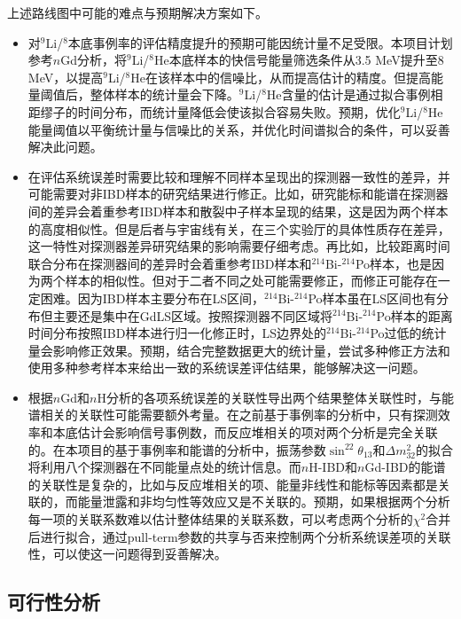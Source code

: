 \documentclass[a4paper,zihao=-4]{article}
\begin{document}
上述路线图中可能的难点与预期解决方案如下。
\begin{itemize}
	\item {}对$^9$Li/$^8$本底事例率的评估精度提升的预期可能因统计量不足受限。本项目计划参考$n$Gd分析，将$^9$Li/$^8$He本底样本的快信号能量筛选条件从3.5 MeV提升至8 MeV，以提高$^9$Li/$^8$He在该样本中的信噪比，从而提高估计的精度。但提高能量阈值后，整体样本的统计量会下降。$^9$Li/$^8$He含量的估计是通过拟合事例相距缪子的时间分布，而统计量降低会使该拟合容易失败。预期，优化$^9$Li/$^8$He能量阈值以平衡统计量与信噪比的关系，并优化时间谱拟合的条件，可以妥善解决此问题。
	\item {}在评估系统误差时需要比较和理解不同样本呈现出的探测器一致性的差异，并可能需要对非IBD样本的研究结果进行修正。比如，研究能标和能谱在探测器间的差异会着重参考IBD样本和散裂中子样本呈现的结果，这是因为两个样本的高度相似性。但是后者与宇宙线有关，在三个实验厅的具体性质存在差异，这一特性对探测器差异研究结果的影响需要仔细考虑。再比如，比较距离时间联合分布在探测器间的差异时会着重参考IBD样本和$^{214}$Bi-$^{214}$Po样本，也是因为两个样本的相似性。但对于二者不同之处可能需要修正，而修正可能存在一定困难。因为IBD样本主要分布在LS区间，$^{214}$Bi-$^{214}$Po样本虽在LS区间也有分布但主要还是集中在GdLS区域。按照探测器不同区域将$^{214}$Bi-$^{214}$Po样本的距离时间分布按照IBD样本进行归一化修正时，LS边界处的$^{214}$Bi-$^{214}$Po过低的统计量会影响修正效果。预期，结合完整数据更大的统计量，尝试多种修正方法和使用多种参考样本来给出一致的系统误差评估结果，能够解决这一问题。
	\item {}根据$n$Gd和$n$H分析的各项系统误差的关联性导出两个结果整体关联性时，与能谱相关的关联性可能需要额外考量。在之前基于事例率的分析中，只有探测效率和本底估计会影响信号事例数，而反应堆相关的项对两个分析是完全关联的。在本项目的基于事例率和能谱的分析中，振荡参数$\sin^22\theta_{13}$和$\Delta m_{32}^2$的拟合将利用八个探测器在不同能量点处的统计信息。而$n$H-IBD和$n$Gd-IBD的能谱的关联性是复杂的，比如与反应堆相关的项、能量非线性和能标等因素都是关联的，而能量泄露和非均匀性等效应又是不关联的。预期，如果根据两个分析每一项的关联系数难以估计整体结果的关联系数，可以考虑两个分析的$\chi^2$合并后进行拟合，通过pull-term参数的共享与否来控制两个分析系统误差项的关联性，可以使这一问题得到妥善解决。
\end{itemize}

\subsection{可行性分析}
\end{document}
